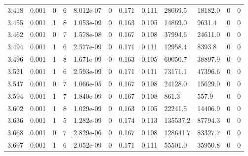 \documentclass[preview]{standalone}
\begin{document}
{{{\begin{tabular}{L{1.2cm}C{1.2cm} C{0.3cm}C{0.5cm} C{1.4cm}C{1.4cm} C{1.4cm}C{1.4cm} C{1.6cm}C{1.6cm} C{1.6cm}C{1.6cm}}
  3.418  &  0.001  & 0     &  6 &  8.012e-07  & 0  &  0.171&   0.111& 28069.5 & 18182.0   &  0 & 0  \\ 
  3.455  &  0.001  & 1     &  8 &  1.053e-09  & 0  &  0.163&   0.105& 14869.0 & 9631.4   &  0 & 0  \\ 
  3.462  &  0.001  & 0     &  7 &  1.578e-08  & 0  &  0.167&   0.108& 37994.6 & 24611.0   &  0 & 0  \\ 
  3.494  &  0.001  & 1     &  6 &  2.577e-09  & 0  &  0.171&   0.111& 12958.4 & 8393.8   &  0 & 0  \\ 
  3.496  &  0.001  & 1     &  8 &  1.671e-09  & 0  &  0.163&   0.105& 60050.7 & 38897.9   &  0 & 0  \\ 
  3.521  &  0.001  & 1     &  6 &  2.593e-09  & 0  &  0.171&   0.111& 73171.1 & 47396.6   &  0 & 0  \\ 
  3.547  &  0.001  & 0     &  7 &  1.066e-05  & 0  &  0.167&   0.108& 24128.0 & 15629.0   &  0 & 0  \\ 
  3.594  &  0.001  & 1     &  7 &  1.840e-09  & 0  &  0.167&   0.108& 861.3 & 557.9   &  0 & 0  \\ 
  3.602  &  0.001  & 1     &  8 &  1.029e-09  & 0  &  0.163&   0.105& 22241.5 & 14406.9   &  0 & 0  \\ 
  3.636  &  0.001  & 1     &  5 &  1.282e-09  & 0  &  0.174&   0.113& 135537.2 & 87794.3   &  0 & 0  \\ 
  3.668  &  0.001  & 0     &  7 &  2.829e-06  & 0  &  0.167&   0.108& 128641.7 & 83327.7   &  0 & 0  \\ 
  3.697  &  0.001  & 1     &  6 &  2.052e-09  & 0  &  0.171&   0.111& 55501.0 & 35950.8   &  0 & 0  \\ 
\hline 
\end{tabular} 

}}}
\end{document}
